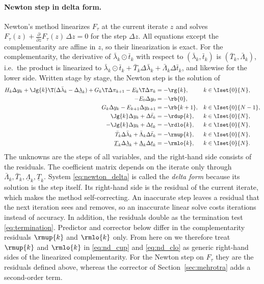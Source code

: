 \paragraph{Newton step in delta form.}
Newton's method linearizes $F_\tau$ at the current iterate $z$ and solves $F_\tau(z) + \frac{\partial}{\partial z} F_\tau(z)\, \Delta z = 0$ for the step $\Delta z$.
All equations except the complementarity are affine in $z$, so their linearization is exact.
For the complementarity, the derivative of $\bar{\lambda}_k \odot \bar{t}_k$ with respect to $(\bar{\lambda}_k, \bar{t}_k)$ is $(\bar{T}_k, \bar{\Lambda}_k)$, i.e.\ the product is linearized to $\bar{\lambda}_k \odot \bar{t}_k + \bar{T}_k \Delta\bar{\lambda}_k + \bar{\Lambda}_k \Delta\bar{t}_k$, and likewise for the lower side.
Written stage by stage, the Newton step is the solution of
\begin{subequations} \label{eq:newton_delta}
\begin{align}
    H_k \Delta y_k + \Jg{k}\T(\Delta\bar{\lambda}_k - \Delta\underline{\lambda}_k) + G_k\T \Delta\pi_{k+1} - E_k\T \Delta\pi_k &= -\rg{k} , && k\in\Iset{0}{N}, \label{eq:nd_stat}\\
    -E_0 \Delta y_0 &= -\rb{0} , && \label{eq:nd_init}\\
    G_k \Delta y_k - E_{k+1}\Delta y_{k+1} &= -\rb{k+1} , && k\in\Iset{0}{N-1}, \label{eq:nd_dyn}\\
    \Jg{k} \Delta y_k + \Delta\bar{t}_k &= -\rdup{k} , && k\in\Iset{0}{N}, \label{eq:nd_up}\\
    -\Jg{k} \Delta y_k + \Delta\underline{t}_k &= -\rdlo{k} , && k\in\Iset{0}{N}, \label{eq:nd_lo}\\
    \bar{T}_k \Delta\bar{\lambda}_k + \bar{\Lambda}_k \Delta\bar{t}_k &= -\rmup{k} , && k\in\Iset{0}{N}, \label{eq:nd_cup}\\
    \underline{T}_k \Delta\underline{\lambda}_k + \underline{\Lambda}_k \Delta\underline{t}_k &= -\rmlo{k} , && k\in\Iset{0}{N}. \label{eq:nd_clo}
\end{align}
\end{subequations}
The unknowns are the steps of all variables, and the right-hand side consists of the residuals.
The coefficient matrix depends on the iterate only through $\bar{\Lambda}_k, \bar{T}_k, \underline{\Lambda}_k, \underline{T}_k$.
System \eqref{eq:newton_delta} is called the \textit{delta form} because its solution is the step itself.
Its right-hand side is the residual of the current iterate, which makes the method self-correcting.
An inaccurate step leaves a residual that the next iteration sees and removes, so an inaccurate linear solve costs iterations instead of accuracy.
In addition, the residuals double as the termination test \eqref{eq:termination}.
Predictor and corrector below differ in the complementarity residuals $\rmup{k}$ and $\rmlo{k}$ only.
From here on we therefore treat $\rmup{k}$ and $\rmlo{k}$ in \eqref{eq:nd_cup} and \eqref{eq:nd_clo} as generic right-hand sides of the linearized complementarity.
For the Newton step on $F_\tau$ they are the residuals defined above, whereas the corrector of Section~\ref{sec:mehrotra} adds a second-order term.

